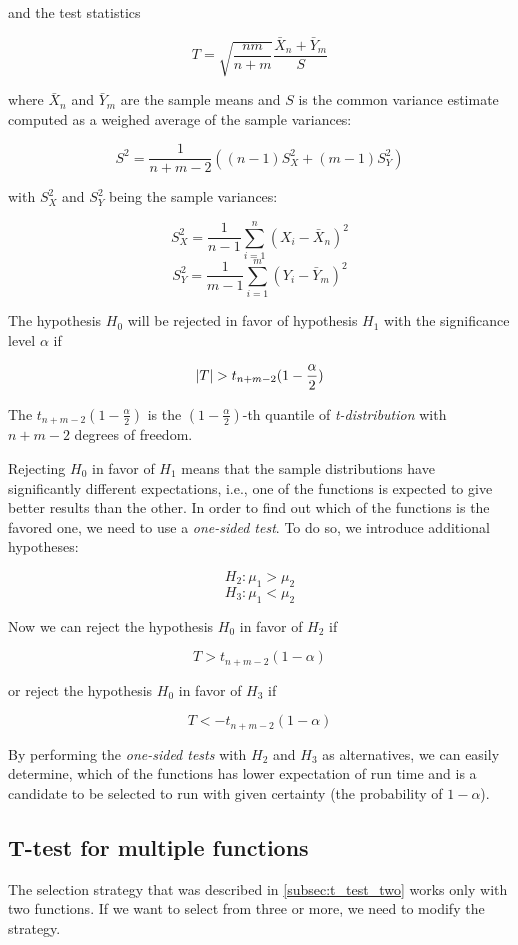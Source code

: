 and the test statistics

\[
T = \sqrt{\frac{nm}{n + m}}\frac{\bar{X}_n + \bar{Y}_m}{S}
\]

where $\bar{X}_n$ and $\bar{Y}_m$ are the sample means and $S$ is the common variance estimate computed as a weighed average of the sample variances:

\[
S^2 = \frac{1}{n + m -2} ((n-1)S_X^2 + (m-1)S_Y^2)
\]

with $S_X^2$ and $S_Y^2$ being the sample variances:

\[
S_X^2 = \frac{1}{n-1} \sum_{i=1}^{n}(X_i - \bar{X}_n)^2
\]
\[
S_Y^2 = \frac{1}{m-1} \sum_{i=1}^{m}(Y_i - \bar{Y}_m)^2
\]

The hypothesis $H_0$ will be rejected in favor of hypothesis $H_1$ with the significance level $\alpha$ if

\[\left|{T}\right| > t_{n + m - 2}(1-\frac{\alpha}{2})\]

The $t_{n + m - 2}(1-\frac{\alpha}{2})$ is the $(1-\frac{\alpha}{2})$-th quantile of \textit{t-distribution} with $n+m-2$ degrees of freedom.

Rejecting $H_0$ in favor of $H_1$ means that the sample distributions have significantly different expectations, i.e., one of the functions is expected to give better results than the other. In order to find out which of the functions is the favored one, we need to use a \textit{one-sided test}. To do so, we introduce additional hypotheses:

\[
H_2: \mu_1 > \mu_2
\]
\[
H_3: \mu_1 < \mu_2
\]

Now we can reject the hypothesis $H_0$ in favor of $H_2$ if

\[T > t_{n + m - 2}(1-\alpha)\]

or reject the hypothesis $H_0$ in favor of $H_3$ if

\[T < -t_{n + m - 2}(1-\alpha)\]

By performing the \textit{one-sided tests} with $H_2$ and $H_3$ as alternatives, we can easily determine, which of the functions has lower expectation of run time and is a candidate to be selected to run with given certainty (the probability of $1-\alpha$).

\subsection{T-test for multiple functions}
\label{subsec:t_test_multiple}

The selection strategy that was described in \ref{subsec:t_test_two} works only with two functions. If we want to select from three or more, we need to modify the strategy.

